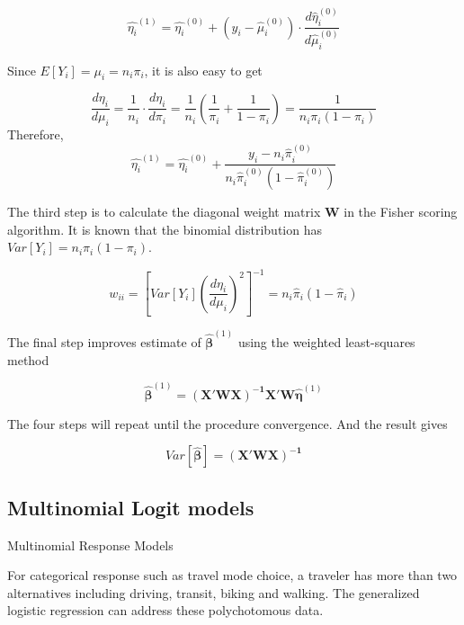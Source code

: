 \documentclass[
  11pt,
  openany]{memoir}
\begin{document}
\begin{equation}
\hat{\eta_i}^{(1)}=\hat{\eta_i}^{(0)} +(y_i-\hat\mu_i^{(0)})\cdot \frac{d\hat\eta_i^{(0)}}{d\hat\mu_i^{(0)}}
\end{equation}

Since \(E[Y_i]=\mu_i=n_i\pi_i\), it is also easy to get

\begin{equation}
\frac{d \eta_i}{d \mu_i}=\frac{1}{n_i}\cdot\frac{d \eta_i}{d \pi_i}=\frac{1}{n_i}\left(\frac{1}{\pi_i}+\frac{1}{1-\pi_i}\right)=\frac1{n_i\pi_i(1-\pi_i)}
\end{equation}
Therefore,
\begin{equation}
\hat{\eta_i}^{(1)}=\hat{\eta_i}^{(0)} + \frac{y_i-n_i\hat\pi_i^{(0)}}{n_i\hat\pi_i^{(0)}(1-\hat\pi_i^{(0)})}
\end{equation}

The third step is to calculate the diagonal weight matrix \(\mathbf{W}\) in the Fisher scoring algorithm.
It is known that the binomial distribution has \(Var[Y_i]=n_i\pi_i(1-\pi_i)\).

\begin{equation}
w_{ii}=\left[Var[Y_i](\frac{d \eta_i}{d \mu_i})^2\right]^{-1}=
n_i\hat\pi_i(1-\hat\pi_i)
\end{equation}

The final step improves estimate of \(\boldsymbol{\hat\beta}^{(1)}\) using the weighted least-squares method

\begin{equation}
\hat{\boldsymbol{\beta}}^{(1)}=\mathbf{(X'WX)^{-1}}\mathbf{X'W}\boldsymbol{\hat{\eta}}^{(1)}
\end{equation}

The four steps will repeat until the procedure convergence. And the result gives

\begin{equation}
Var[\hat{\boldsymbol{\beta}}]=\mathbf{(X'WX)^{-1}}
\end{equation}

\hypertarget{multinomial-logit-models}{%
\subsection{Multinomial Logit models}\label{multinomial-logit-models}}

Multinomial Response Models

For categorical response such as travel mode choice, a traveler has more than two alternatives including driving, transit, biking and walking. The generalized logistic regression can address these polychotomous data.
\end{document}
